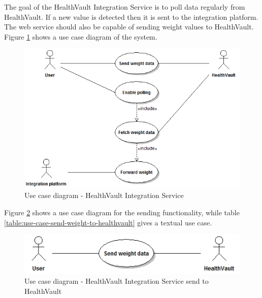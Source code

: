 The goal of the HealthVault Integration Service is to poll data regularly from HealthVault.
If a new value is detected then it is sent to the integration platform.
The web service should also be capable of sending weight values to HealthVault.
Figure \ref{figure:use-case-diagram-weight-service} shows a use case diagram of the system.

\begin{figure}[H]
\centering
\includegraphics[scale=0.75]{../Figures/use-case-diagram-weight-service.png}
\caption{Use case diagram - HealthVault Integration Service}
\label{figure:use-case-diagram-weight-service}
\end{figure}

Figure \ref{figure:use-case-diagram-weight-service-send} shows a use case diagram for the sending functionality, while table \ref{table:use-case-send-weight-to-healthvault} gives a textual use case.

\begin{figure}[H]
\centering
\includegraphics[scale=0.75]{../Figures/use-case-diagram-weight-service-send.png}
\caption{Use case diagram - HealthVault Integration Service send to HealthVault}
\label{figure:use-case-diagram-weight-service-send}
\end{figure}

